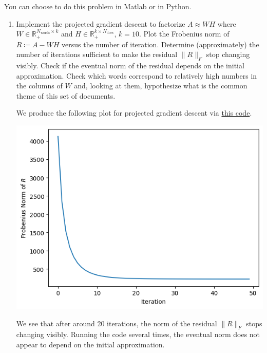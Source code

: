 \documentclass{../../../kin_math}
\begin{document}
\begin{questions}
  You can choose to do this problem in Matlab or in Python.
  \begin{enumerate}
    \item Implement the projected gradient descent to factorize $A \approx WH$ where $W \in \mathbb{R}_+^{N_\text{words} \times k}$ and $H \in \mathbb{R}_+^{k \times N_\text{docs}}$, $k = 10$. Plot the Frobenius norm of $R \coloneqq A - WH$ versus the number of iteration. Determine (approximately) the number of iterations sufficient to make the residual $\lVert R \rVert_F$ stop changing visibly. Check if the eventual norm of the residual depends on the initial approximation. Check which words correspond to relatively high numbers in the columns of $W$ and, looking at them, hypothesize what is the common theme of this set of documents.
    \begin{solution}
      We produce the following plot for projected gradient descent via \href{https://github.com/elijahkin/school/blob/main/umd/amsc660/hw6/hw6.ipynb}{this code}.
      \begin{center}
        \includegraphics[scale=0.7]{pgd.png}
      \end{center}
      We see that after around 20 iterations, the norm of the residual $\lVert R \rVert_F$ stops changing visibly. Running the code several times, the eventual norm does not appear to depend on the initial approximation.


\end{solution}
\end{enumerate}
\end{questions}
\end{document}
